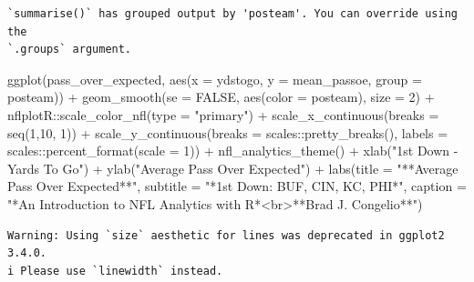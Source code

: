 \documentclass[
  letterpaper,
]{krantz}
\newenvironment{Shaded}{\begin{snugshade}}{\end{snugshade}}
\newcommand{\AttributeTok}[1]{\textcolor[rgb]{0.40,0.45,0.13}{#1}}
\newcommand{\ConstantTok}[1]{\textcolor[rgb]{0.56,0.35,0.01}{#1}}
\newcommand{\DecValTok}[1]{\textcolor[rgb]{0.68,0.00,0.00}{#1}}
\newcommand{\FunctionTok}[1]{\textcolor[rgb]{0.28,0.35,0.67}{#1}}
\newcommand{\NormalTok}[1]{\textcolor[rgb]{0.00,0.23,0.31}{#1}}
\newcommand{\SpecialCharTok}[1]{\textcolor[rgb]{0.37,0.37,0.37}{#1}}
\newcommand{\StringTok}[1]{\textcolor[rgb]{0.13,0.47,0.30}{#1}}
\begin{document}
\begin{verbatim}
`summarise()` has grouped output by 'posteam'. You can override using the
`.groups` argument.
\end{verbatim}

\begin{Shaded}
\begin{Highlighting}[]
\FunctionTok{ggplot}\NormalTok{(pass\_over\_expected, }\FunctionTok{aes}\NormalTok{(}\AttributeTok{x =}\NormalTok{ ydstogo, }\AttributeTok{y =}\NormalTok{ mean\_passoe,}
                               \AttributeTok{group =}\NormalTok{ posteam)) }\SpecialCharTok{+}
  \FunctionTok{geom\_smooth}\NormalTok{(}\AttributeTok{se =} \ConstantTok{FALSE}\NormalTok{, }\FunctionTok{aes}\NormalTok{(}\AttributeTok{color =}\NormalTok{ posteam), }\AttributeTok{size =} \DecValTok{2}\NormalTok{) }\SpecialCharTok{+}
\NormalTok{  nflplotR}\SpecialCharTok{::}\FunctionTok{scale\_color\_nfl}\NormalTok{(}\AttributeTok{type =} \StringTok{"primary"}\NormalTok{) }\SpecialCharTok{+}
  \FunctionTok{scale\_x\_continuous}\NormalTok{(}\AttributeTok{breaks =} \FunctionTok{seq}\NormalTok{(}\DecValTok{1}\NormalTok{,}\DecValTok{10}\NormalTok{, }\DecValTok{1}\NormalTok{)) }\SpecialCharTok{+}
  \FunctionTok{scale\_y\_continuous}\NormalTok{(}\AttributeTok{breaks =}\NormalTok{ scales}\SpecialCharTok{::}\FunctionTok{pretty\_breaks}\NormalTok{(),}
                     \AttributeTok{labels =}\NormalTok{ scales}\SpecialCharTok{::}\FunctionTok{percent\_format}\NormalTok{(}\AttributeTok{scale =} \DecValTok{1}\NormalTok{)) }\SpecialCharTok{+}
  \FunctionTok{nfl\_analytics\_theme}\NormalTok{() }\SpecialCharTok{+}
  \FunctionTok{xlab}\NormalTok{(}\StringTok{"1st Down {-} Yards To Go"}\NormalTok{) }\SpecialCharTok{+}
  \FunctionTok{ylab}\NormalTok{(}\StringTok{"Average Pass Over Expected"}\NormalTok{) }\SpecialCharTok{+}
  \FunctionTok{labs}\NormalTok{(}\AttributeTok{title =} \StringTok{"**Average Pass Over Expected**"}\NormalTok{,}
       \AttributeTok{subtitle =} \StringTok{"*1st Down: BUF, CIN, KC, PHI*"}\NormalTok{,}
       \AttributeTok{caption =} \StringTok{"*An Introduction to NFL Analytics with R*\textless{}br\textgreater{}**Brad J. Congelio**"}\NormalTok{)}
\end{Highlighting}
\end{Shaded}

\begin{verbatim}
Warning: Using `size` aesthetic for lines was deprecated in ggplot2 3.4.0.
i Please use `linewidth` instead.
\end{verbatim}
\end{document}
